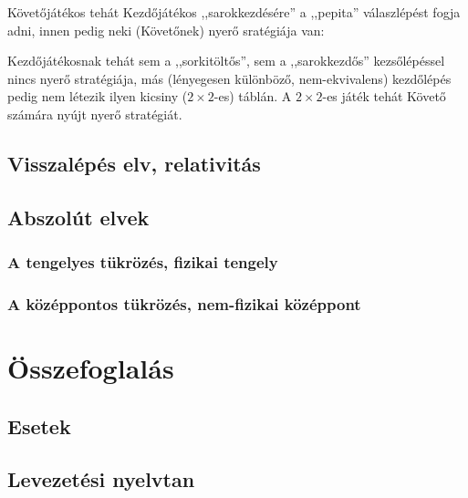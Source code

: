 \documentclass{article}
\newcommand{\anz}[1]{$\mathrm{I}_{#1}$}
\newcommand{\nch}[1]{$\mathrm{II}_{#1}$}
\begin{document}
				Követőjátékos tehát  Kezdőjátékos ,,sarokkezdésére'' a ,,pepita'' válaszlépést fogja adni, innen pedig neki (Követőnek) nyerő sratégiája van:\\

				Kezdőjátékosnak tehát sem a ,,sorkitöltős'', sem a ,,sarokkezdős'' kezsőlépéssel nincs nyerő stratégiája, más (lényegesen különböző, nem-ekvivalens) kezdőlépés pedig nem létezik ilyen kicsiny ($2\times2$-es) táblán. A $2\times2$-es játék tehát Követő számára nyújt nyerő stratégiát.
		\subsection{Visszalépés elv, relativitás}
		\subsection{Abszolút elvek}
			\subsubsection{A tengelyes tükrözés, fizikai tengely}
			\subsubsection{A középpontos tükrözés, nem-fizikai középpont}
	\section{Összefoglalás}
		\subsection{Esetek}
		\subsection{Levezetési nyelvtan}
\end{document}
